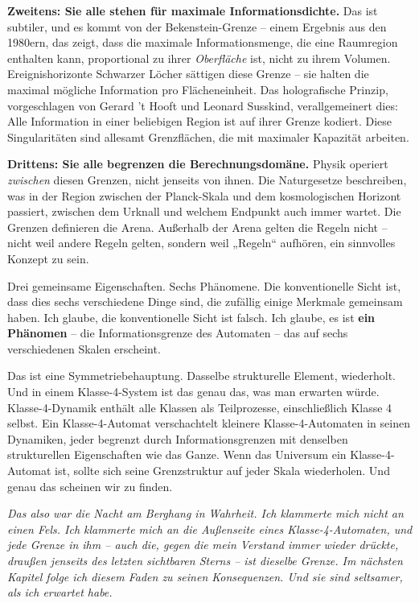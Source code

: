 \documentclass[11pt, twoside, openright]{book}
\begin{document}
\textbf{Zweitens: Sie alle stehen für maximale Informationsdichte.} Das ist subtiler, und es kommt von der Bekenstein-Grenze -- einem Ergebnis aus den 1980ern, das zeigt, dass die maximale Informationsmenge, die eine Raumregion enthalten kann, proportional zu ihrer \textit{Oberfläche} ist, nicht zu ihrem Volumen. Ereignishorizonte Schwarzer Löcher sättigen diese Grenze -- sie halten die maximal mögliche Information pro Flächeneinheit. Das holografische Prinzip, vorgeschlagen von Gerard 't Hooft und Leonard Susskind, verallgemeinert dies: Alle Information in einer beliebigen Region ist auf ihrer Grenze kodiert. Diese Singularitäten sind allesamt Grenzflächen, die mit maximaler Kapazität arbeiten.

\textbf{Drittens: Sie alle begrenzen die Berechnungsdomäne.} Physik operiert \textit{zwischen} diesen Grenzen, nicht jenseits von ihnen. Die Naturgesetze beschreiben, was in der Region zwischen der Planck-Skala und dem kosmologischen Horizont passiert, zwischen dem Urknall und welchem Endpunkt auch immer wartet. Die Grenzen definieren die Arena. Außerhalb der Arena gelten die Regeln nicht -- nicht weil andere Regeln gelten, sondern weil „Regeln“ aufhören, ein sinnvolles Konzept zu sein.

Drei gemeinsame Eigenschaften. Sechs Phänomene. Die konventionelle Sicht ist, dass dies sechs verschiedene Dinge sind, die zufällig einige Merkmale gemeinsam haben. Ich glaube, die konventionelle Sicht ist falsch. Ich glaube, es ist \textbf{ein Phänomen} -- die Informationsgrenze des Automaten -- das auf sechs verschiedenen Skalen erscheint.

Das ist eine Symmetriebehauptung. Dasselbe strukturelle Element, wiederholt. Und in einem Klasse-4-System ist das genau das, was man erwarten würde. Klasse-4-Dynamik enthält alle Klassen als Teilprozesse, einschließlich Klasse 4 selbst. Ein Klasse-4-Automat verschachtelt kleinere Klasse-4-Automaten in seinen Dynamiken, jeder begrenzt durch Informationsgrenzen mit denselben strukturellen Eigenschaften wie das Ganze. Wenn das Universum ein Klasse-4-Automat ist, sollte sich seine Grenzstruktur auf jeder Skala wiederholen. Und genau das scheinen wir zu finden.


\textit{Das also war die Nacht am Berghang in Wahrheit. Ich klammerte mich nicht an einen Fels. Ich klammerte mich an die Außenseite eines Klasse-4-Automaten, und jede Grenze in ihm -- auch die, gegen die mein Verstand immer wieder drückte, draußen jenseits des letzten sichtbaren Sterns -- ist dieselbe Grenze. Im nächsten Kapitel folge ich diesem Faden zu seinen Konsequenzen. Und sie sind seltsamer, als ich erwartet habe.}
\end{document}
